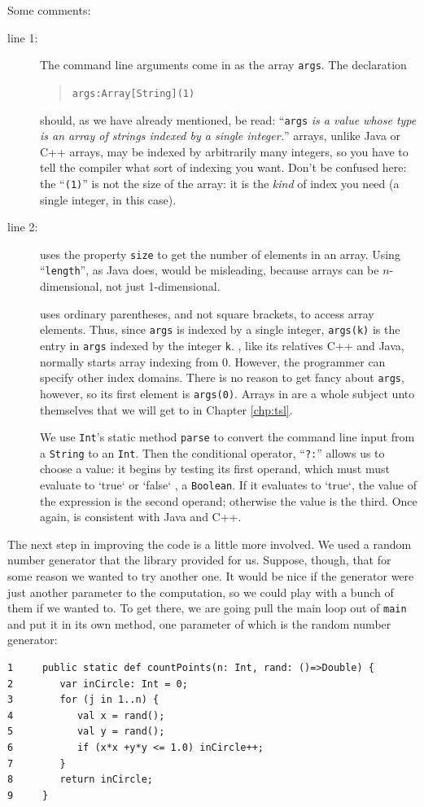 Some comments:
\begin{description}
\item[line 1:]
The command line arguments come in as the array {\tt args}.  The declaration
\begin{quote} {\tt args:Array[String](1)}  \end{quote}
should, as we have already mentioned, be read: ``{\tt args} {\em is a value whose type
is an array of strings indexed by a single integer.}''   \Xten{} arrays, unlike Java
or C++ arrays, may be indexed by arbitrarily many integers, so you have to 
tell the compiler what sort of indexing you want.  Don't be confused here: the
``{\tt (1)}'' is not the size of the array: it is the {\em kind} of index you
need (a single integer, in this case).
\item[line 2:]
 \Xten{} uses the property {\tt size} to get the number of elements in
an array.  Using ``{\tt length}'', as Java does,
would be misleading, because \Xten{} arrays can be $n$-dimensional, not just
1-dimensional.

\Xten{} uses ordinary parentheses, and not square brackets, to access array elements.  
Thus, since {\tt args} is indexed by a single integer, {\tt args(k)} is the
entry in {\tt args} indexed by the integer {\tt k}.  \Xten, like its relatives
C++ and Java, normally starts array indexing from 0.  However, the \Xten{} programmer can
specify other index domains. There is no reason to get fancy about {\tt args}, however,
so its first element is {\tt args(0)}. Arrays in \Xten{} are a whole subject unto
themselves that we will get to in Chapter \ref{chp:tsl}.

We use {\tt Int}'s static method {\tt parse} to convert the command line input
from a {\tt String} to an {\tt Int}.  Then the conditional operator, 
``{\tt ?:}'' allows us to choose a value:
it begins by testing its first operand, which must must evaluate to \xcd`true`
or 
\xcd`false`
, \ie{} a {\tt Boolean}. If it evaluates to \xcd`true`, the value of the
expression is the second operand; otherwise the value is the third.
Once again, \Xten{} is consistent with Java and C++.
\end{description} 
The next step in improving the code is a little more involved.
We used a random number generator
that the \Xten{} library provided for us.  Suppose, though,
that for some reason we wanted to try another one. 
It would be nice if the generator
were just another parameter to the computation, so we could play with a bunch
of them if we wanted to.  To get there, we are going pull the main loop
out of {\tt main} and put it in its own method, one parameter of which is the
random number generator:
\begin{verbatim}
1     public static def countPoints(n: Int, rand: ()=>Double) {
2        var inCircle: Int = 0;
3        for (j in 1..n) {
4           val x = rand();
5           val y = rand();
6           if (x*x +y*y <= 1.0) inCircle++;
7        }
8        return inCircle;
9     }
\end{verbatim}
 


